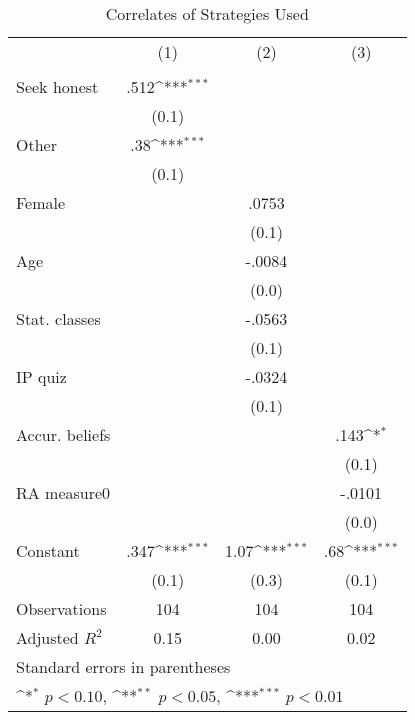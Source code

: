\begin{table}[htbp]\centering
\def\sym#1{\ifmmode^{#1}\else\(^{#1}\)\fi}
\caption{Correlates of Strategies Used}
\begin{tabular}{l*{3}{c}}
\hline\hline
                &\multicolumn{1}{c}{(1)}&\multicolumn{1}{c}{(2)}&\multicolumn{1}{c}{(3)}\\
                &\multicolumn{1}{c}{}&\multicolumn{1}{c}{}&\multicolumn{1}{c}{}\\
\hline
Seek honest     &     .512\sym{***}&                  &                  \\
                &    (0.1)         &                  &                  \\
Other           &      .38\sym{***}&                  &                  \\
                &    (0.1)         &                  &                  \\
Female          &                  &    .0753         &                  \\
                &                  &    (0.1)         &                  \\
Age             &                  &   -.0084         &                  \\
                &                  &    (0.0)         &                  \\
Stat. classes   &                  &   -.0563         &                  \\
                &                  &    (0.1)         &                  \\
IP quiz         &                  &   -.0324         &                  \\
                &                  &    (0.1)         &                  \\
Accur. beliefs  &                  &                  &     .143\sym{*}  \\
                &                  &                  &    (0.1)         \\
RA measure0     &                  &                  &   -.0101         \\
                &                  &                  &    (0.0)         \\
Constant        &     .347\sym{***}&     1.07\sym{***}&      .68\sym{***}\\
                &    (0.1)         &    (0.3)         &    (0.1)         \\
\hline
Observations    &      104         &      104         &      104         \\
Adjusted \(R^{2}\)&     0.15         &     0.00         &     0.02         \\
\hline\hline
\multicolumn{4}{l}{\footnotesize Standard errors in parentheses}\\
\multicolumn{4}{l}{\footnotesize \sym{*} \(p<0.10\), \sym{**} \(p<0.05\), \sym{***} \(p<0.01\)}\\
\end{tabular}
\end{table}
